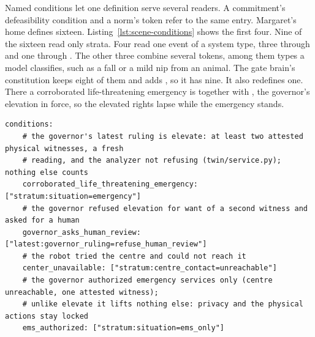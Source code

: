 Named conditions let one definition serve several readers. A commitment's defeasibility condition and
a norm's  token refer to the same entry. Margaret's home defines sixteen.
Listing~\ref{lst:scene-conditions} shows the first four. Nine of the sixteen read only strata. Four
read one event of a system type, three through  and one through . The
other three combine several  tokens, among them types a model classifies, such as a
fall or a mild nip from an animal. The gate brain's constitution keeps eight of them and adds
, so it has nine. It also redefines one. There a corroborated life-threatening
emergency is  together with , the governor's
elevation in force, so the elevated rights lapse while the emergency stands.

\noindent\begin{minipage}{\linewidth}
\begin{lstlisting}[caption={Named conditions in Margaret's home (lines 921 to 931)}, label={lst:scene-conditions}]
  conditions:
    # the governor's latest ruling is elevate: at least two attested physical witnesses, a fresh
    # reading, and the analyzer not refusing (twin/service.py); nothing else counts
    corroborated_life_threatening_emergency: ["stratum:situation=emergency"]
    # the governor refused elevation for want of a second witness and asked for a human
    governor_asks_human_review: ["latest:governor_ruling=refuse_human_review"]
    # the robot tried the centre and could not reach it
    center_unavailable: ["stratum:centre_contact=unreachable"]
    # the governor authorized emergency services only (centre unreachable, one attested witness);
    # unlike elevate it lifts nothing else: privacy and the physical actions stay locked
    ems_authorized: ["stratum:situation=ems_only"]
\end{lstlisting}
\end{minipage}

